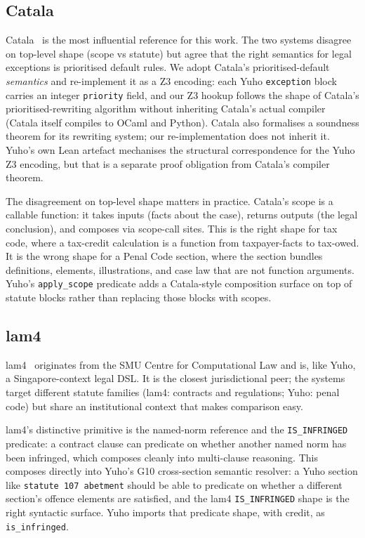 \subsection{Catala}
\label{subsec:rel_catala}

Catala~\cite{catala2021} is the most influential reference for this
work. The two systems disagree on top-level shape (scope vs statute)
but agree that the right semantics for legal exceptions is prioritised
default rules. We adopt Catala's prioritised-default \emph{semantics}
and re-implement it as a Z3 encoding: each Yuho \texttt{exception}
block carries an integer \texttt{priority} field, and our Z3 hookup
follows the shape of Catala's prioritised-rewriting algorithm without
inheriting Catala's actual compiler (Catala itself compiles to OCaml
and Python). Catala also formalises a soundness theorem for its
rewriting system; our re-implementation does not inherit it. Yuho's
own Lean artefact mechanises the structural correspondence for the
Yuho Z3 encoding, but that is a separate proof obligation from
Catala's compiler theorem.

The disagreement on top-level shape matters in practice. Catala's
scope is a callable function: it takes inputs (facts about the case),
returns outputs (the legal conclusion), and composes via scope-call
sites. This is the right shape for tax code, where a tax-credit
calculation is a function from taxpayer-facts to tax-owed. It is the
wrong shape for a Penal Code section, where the section bundles
definitions, elements, illustrations, and case law that are not
function arguments. Yuho's \texttt{apply\_scope} predicate adds a
Catala-style composition surface on top of statute blocks rather than
replacing those blocks with scopes.

\subsection{lam4}
\label{subsec:rel_lam4}

lam4~\cite{lam4} originates from the SMU Centre for Computational
Law and is, like Yuho, a Singapore-context legal DSL. It is the
closest jurisdictional peer; the systems target different statute
families (lam4: contracts and regulations; Yuho: penal code) but
share an institutional context that makes comparison easy.

lam4's distinctive primitive is the named-norm reference and the
\texttt{IS\_INFRINGED} predicate: a contract clause can predicate
on whether another named norm has been infringed, which composes
cleanly into multi-clause reasoning. This composes directly into
Yuho's \textsf{G10} cross-section semantic resolver: a Yuho
section like \texttt{statute 107 abetment} should be able to
predicate on whether a different section's offence elements are
satisfied, and the lam4 \texttt{IS\_INFRINGED} shape is the right
syntactic surface. Yuho imports that predicate shape, with credit,
as \texttt{is\_infringed}.

